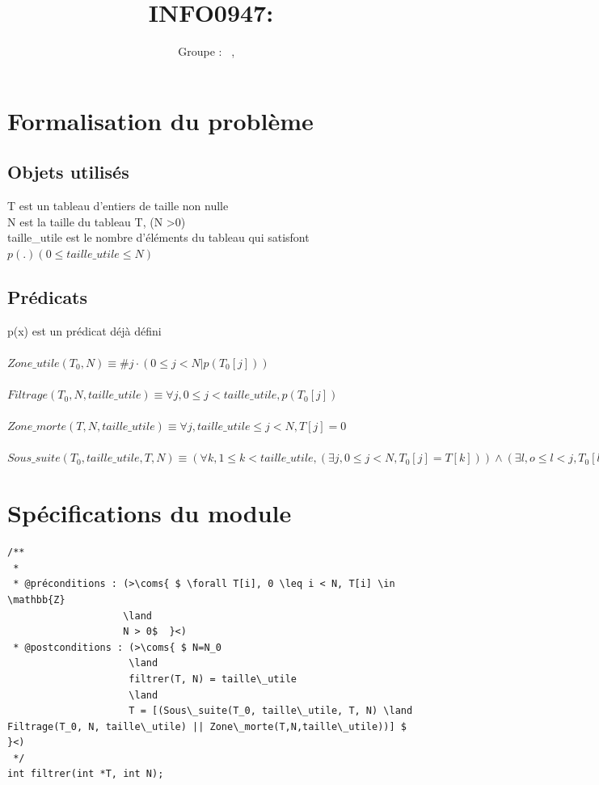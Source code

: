 \documentclass[a4paper, 11pt, oneside]{article}
\title{INFO0947: \intitule}
\author{Groupe \GrNbr : \PrenomUN~\textsc{\NomUN}, \PrenomDEUX~\textsc{\NomDEUX}}
\date{}
\newcommand{\coms}[1]{\textcolor{MidnightBlue}{#1}}
\newcommand{\tablemat}{~}
\renewcommand{\tablemat}{\tableofcontents}
\begin{document}
\maketitle
\newpage
\tablemat
\newpage


\section{Formalisation du problème}
\subsection{Objets utilisés}

T est un tableau d'entiers de taille non nulle
\\
N est la taille du tableau T,  (N \textgreater 0)
\\
taille\_utile est le nombre d'éléments du tableau qui satisfont $p(.) (0 \leq taille\_utile \leq N  )$

\subsection{Prédicats}
p(x) est un prédicat déjà défini 
\\
\\
$Zone\_utile(T_{0},  N)  \equiv \#j \cdot (0\leq j < N|  p(T_{0}[j]))  $
\\
\\
$Filtrage(T_{0}, N,taille\_utile)\equiv \forall j, 0 \leq j < taille\_utile, p(T_{0}[j])$\\
\\
$Zone\_morte(T, N,taille\_utile)\equiv \forall j, taille\_utile \leq j < N, T[j] = 0$ 
\\
\\
$Sous\_suite(T_0, taille\_utile, T, N)\equiv (\forall k, 1 \leq k < taille\_utile, (\exists j, 0 \leq j<N, T_0[j]=T[k]))\land(\exists l, o \leq l < j, T_0[l]=T[k-1]) $


\section{Spécifications du module}


\begin{lstlisting}
/**
 *
 * @préconditions : (>\coms{ $ \forall T[i], 0 \leq i < N, T[i] \in \mathbb{Z}
                    \land
                    N > 0$  }<)
 * @postconditions : (>\coms{ $ N=N_0
                     \land 
                     filtrer(T, N) = taille\_utile
                     \land 
                     T = [(Sous\_suite(T_0, taille\_utile, T, N) \land Filtrage(T_0, N, taille\_utile) || Zone\_morte(T,N,taille\_utile))] $  }<)
 */
int filtrer(int *T, int N);

\end{lstlisting}
\end{document}
